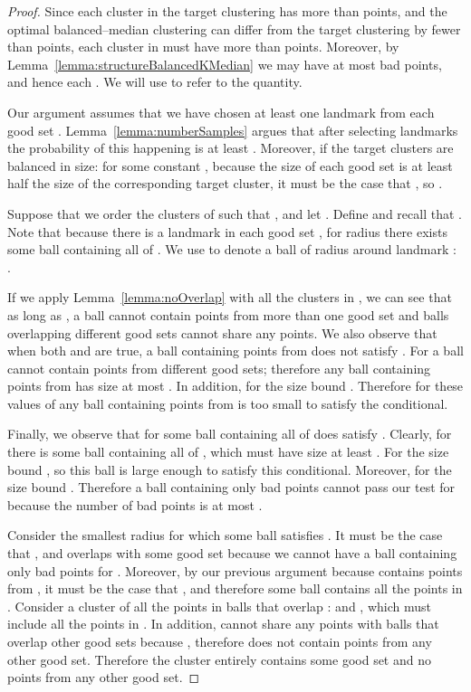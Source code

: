 \documentclass{llncs} \usepackage{algorithm}
\begin{document}
\begin{proof}
Since each cluster in the target clustering has more than
 points, and the optimal balanced--median clustering  can differ from the target clustering by fewer than  points, each cluster in  must have more than  points.  Moreover, by Lemma~\ref{lemma:structureBalancedKMedian} we may have at most  bad points, and hence each .  We will use  to refer to the  quantity.

Our argument assumes that we have chosen at least one landmark from each good set . Lemma~\ref{lemma:numberSamples} argues that after selecting  landmarks the probability of this happening is at least .  Moreover, if the target clusters are balanced in size:  for some constant , because the size of each good set is at least half the size of the corresponding target cluster, it must be the case that , so .

Suppose that we order the clusters of  such that , and let .  Define  and recall that .   Note that because there is a landmark in each good set , for radius  there exists some ball containing all of .  We use  to denote a ball of radius  around landmark : .

If we apply Lemma~\ref{lemma:noOverlap} with all the clusters in , we can see that as long as , a ball cannot contain points from more than one good set and balls overlapping different good sets cannot share any points.  We also observe that when both  and  are true, a ball  containing points from  does not satisfy .  For  a ball cannot contain points from different good sets; therefore any ball containing points from  has size at most .  In addition, for  the size bound .  Therefore for these values of  any ball containing points from  is too small to satisfy the conditional.

Finally, we observe that for  some ball  containing all of  does satisfy .  Clearly, for  there is some ball containing all of , which must have size at least .  For  the size bound , so this ball is large enough to satisfy this conditional.  Moreover, for  the size bound .  Therefore a ball containing only bad points cannot pass our test for  because the number of bad points is at most .

Consider the smallest radius  for which some ball  satisfies .  It must be the case that , and  overlaps with some good set  because we cannot have a ball containing only bad points for .  Moreover, by our previous argument because  contains points from , it must be the case that , and therefore some ball contains all the points in .  Consider a cluster  of all the points in balls that overlap :  and , which must include all the points in .  In addition,  cannot share any points with balls that overlap other good sets because , therefore  does not contain points from any other good set.  Therefore the cluster  entirely contains some good set and no points from any other good set.


\end{proof}
\end{document}

